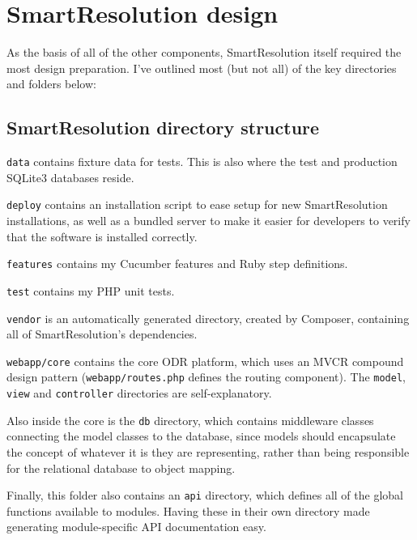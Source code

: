 \section{SmartResolution design}

As the basis of all of the other components, SmartResolution itself required the most design preparation. I've outlined most (but not all) of the key directories and folders below:

\subsection{SmartResolution directory structure}


\lstinline{data} contains fixture data for tests. This is also where the test and production SQLite3 databases reside.

\lstinline{deploy} contains an installation script to ease setup for new SmartResolution installations, as well as a bundled server to make it easier for developers to verify that the software is installed correctly.

\lstinline{features} contains my Cucumber features and Ruby step definitions.

\lstinline{test} contains my PHP unit tests.

\lstinline{vendor} is an automatically generated directory, created by Composer, containing all of SmartResolution's dependencies.

\lstinline{webapp/core} contains the core ODR platform, which uses an MVCR compound design pattern (\lstinline{webapp/routes.php} defines the routing component). The \lstinline{model}, \lstinline{view} and \lstinline{controller} directories are self-explanatory.

Also inside the core is the \lstinline{db} directory, which contains middleware classes connecting the model classes to the database, since models should encapsulate the concept of whatever it is they are representing, rather than being responsible for the relational database to object mapping.

Finally, this folder also contains an \lstinline{api} directory, which defines all of the global functions available to modules. Having these in their own directory made generating module-specific API documentation easy.

